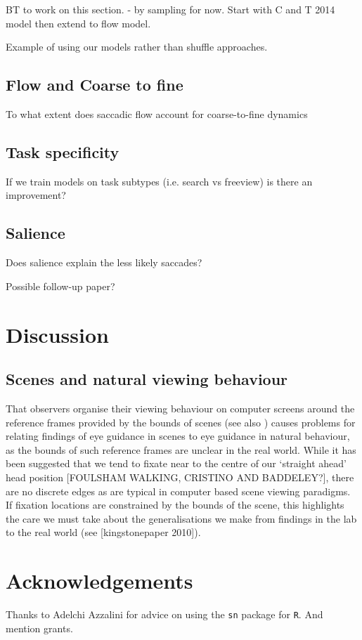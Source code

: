 \documentclass[a4paper, onecolumn, oneside, 11pt]{article}
\begin{document}
BT to work on this section.
 - by sampling for now. Start with C and T 2014 model then extend to flow model.

Example of using our models rather than shuffle approaches.

\subsection{Flow and Coarse to fine}
To what extent does saccadic flow account for coarse-to-fine dynamics

\subsection{Task specificity}

If we train models on task subtypes (i.e. search vs freeview) is there an improvement?

\subsection{Salience}

Does salience explain the less likely saccades? 

Possible follow-up paper?

\section{Discussion}

\cite{}

\subsection{Scenes and natural viewing behaviour}
That observers organise their viewing behaviour on computer screens around the reference frames provided by the bounds of scenes (see also \cite{Stainer:2013ce}) causes problems for relating findings of eye guidance in scenes to eye guidance in natural behaviour, as the bounds of such reference frames are unclear in the real world. While it has been suggested that we tend to fixate near to the centre of our `straight ahead' head position [FOULSHAM WALKING, CRISTINO AND BADDELEY?], there are no discrete edges as are typical in computer based scene viewing paradigms. If fixation locations are constrained by the bounds of the scene, this highlights the care we must take about the generalisations we make from findings in the lab to the real world (see [kingstonepaper 2010]). 






\section*{Acknowledgements}

Thanks to Adelchi Azzalini for advice on using the \texttt{sn} package for \texttt{R}. And mention grants. 


\small

\end{document}
